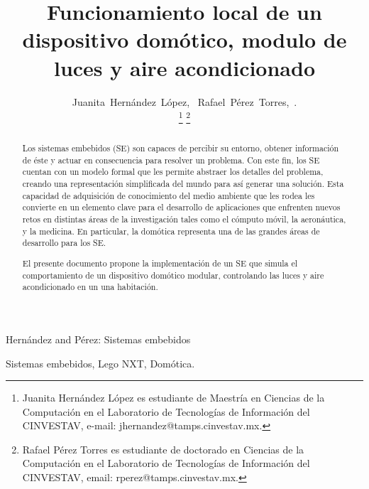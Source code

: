 \documentclass[journal]{IEEEtran}
\begin{document}

\title{Funcionamiento local de un dispositivo domótico, modulo de luces y aire acondicionado}

\author{Juanita~Hernández~López,~
        Rafael~Pérez~Torres,~.

	\thanks{Juanita Hernández López es estudiante de Maestría en Ciencias de la Computación en el Laboratorio de Tecnologías de Información del CINVESTAV, e-mail: jhernandez@tamps.cinvestav.mx.}
	\thanks{Rafael Pérez Torres es estudiante de doctorado en Ciencias de la Computación en el Laboratorio de Tecnologías de Información del CINVESTAV, email: rperez@tamps.cinvestav.mx.}
}

%
{Hernández and Pérez: Sistemas embebidos}

\maketitle

\begin{abstract}
Los sistemas embebidos (SE) son capaces de percibir su entorno, obtener información de éste y actuar en consecuencia para resolver un problema. 
Con este fin, los SE cuentan con un modelo formal que les permite abstraer los detalles del problema, creando una representación simplificada del mundo para así generar una solución.
Esta capacidad de adquisición de conocimiento del medio ambiente que les rodea les convierte en un elemento clave para el desarrollo de aplicaciones que enfrenten nuevos retos en distintas áreas de la investigación tales como el cómputo móvil, la aeronáutica, y la medicina.
En particular, la domótica representa una de las grandes áreas de desarrollo para los SE.

El presente documento propone la implementación de un SE que simula el comportamiento de un dispositivo domótico modular, controlando las luces y aire acondicionado en un una habitación.

\end{abstract}

\begin{IEEEkeywords}
Sistemas embebidos,  Lego NXT, Domótica.
\end{IEEEkeywords}
\end{document}
